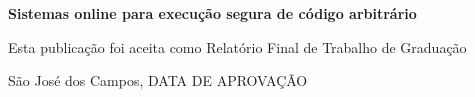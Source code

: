 \documentclass[ruledheader, 12pt]{abnt}
\begin{document}
\folhaderosto
{}
\begin{folhadeaprovacao}
	\setlength\ABNTsignwidth{10cm}
	\setlength\ABNTsignthickness{0.4pt}
	\setlength\ABNTsignskip{3cm}
	\begin{center}
		\textbf{Sistemas online para execução segura de código arbitrário}
		
		Esta publicação foi aceita como Relatório Final de Trabalho de Graduação
	\end{center}
	
	
	\vfill
	\begin{center}
		São José dos Campos, DATA DE APROVAÇÃO
	\end{center}
\end{folhadeaprovacao}
\end{document}
